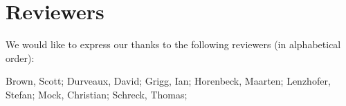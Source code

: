 \section{Reviewers}

We would like to express our thanks to the following reviewers (in alphabetical order):

Brown, Scott;
Durveaux, David;
Grigg, Ian; 
Horenbeck, Maarten;
Lenzhofer, Stefan;
Mock, Christian; 
Schreck, Thomas; 



